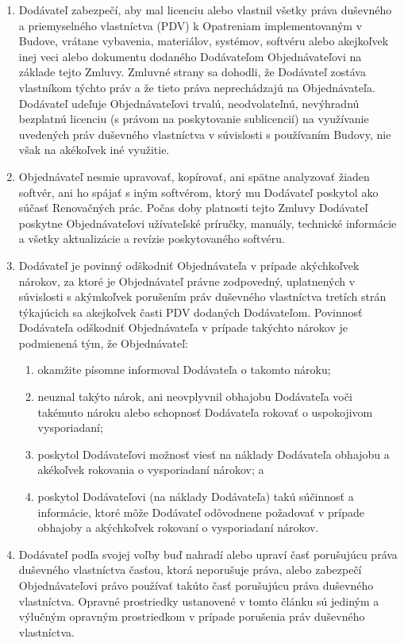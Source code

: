 \begin{multicols}{2}
\begin{enumerate}
\def\labelenumi{\arabic{enumi}.}
\item
  Dodávateľ zabezpečí, aby mal licenciu alebo vlastnil všetky práva
  duševného a priemyselného vlastníctva (PDV) k Opatreniam
  implementovaným v Budove, vrátane vybavenia, materiálov, systémov,
  softvéru alebo akejkoľvek inej veci alebo dokumentu dodaného
  Dodávateľom Objednávateľovi na základe tejto Zmluvy. Zmluvné strany sa
  dohodli, že Dodávateľ zostáva vlastníkom týchto práv a že tieto práva
  neprechádzajú na Objednávateľa. Dodávateľ udeľuje Objednávateľovi
  trvalú, neodvolateľnú, nevýhradnú bezplatnú licenciu (s právom na
  poskytovanie sublicencií) na využívanie uvedených práv duševného
  vlastníctva v súvislosti s používaním Budovy, nie však na akékoľvek
  iné využitie.
\item
  Objednávateľ nesmie upravovať, kopírovať, ani spätne analyzovať žiaden
  softvér, ani ho spájať s iným softvérom, ktorý mu Dodávateľ poskytol
  ako súčasť Renovačných prác. Počas doby platnosti tejto Zmluvy
  Dodávateľ poskytne Objednávateľovi užívateľské príručky, manuály,
  technické informácie a všetky aktualizácie a revízie poskytovaného
  softvéru.
\item
  Dodávateľ je povinný odškodniť Objednávateľa v prípade akýchkoľvek
  nárokov, za ktoré je Objednávateľ právne zodpovedný, uplatnených v
  súvislosti s akýmkoľvek porušením práv duševného vlastníctva tretích
  strán týkajúcich sa akejkoľvek časti PDV dodaných Dodávateľom.
  Povinnosť Dodávateľa odškodniť Objednávateľa v prípade takýchto
  nárokov je podmienená tým, že Objednávateľ:

  \begin{enumerate}
  \def\labelenumii{\arabic{enumii}.}
  \item
    okamžite písomne informoval Dodávateľa o takomto nároku;
  \item
    neuznal takýto nárok, ani neovplyvnil obhajobu Dodávateľa voči
    takémuto nároku alebo schopnosť Dodávateľa rokovať o uspokojivom
    vysporiadaní;
  \item
    poskytol Dodávateľovi možnosť viesť na náklady Dodávateľa obhajobu a
    akékoľvek rokovania o vysporiadaní nárokov; a
  \item
    poskytol Dodávateľovi (na náklady Dodávateľa) takú súčinnosť a
    informácie, ktoré môže Dodávateľ odôvodnene požadovať v prípade
    obhajoby a akýchkoľvek rokovaní o vysporiadaní nárokov.
  \end{enumerate}
\item
  Dodávateľ podľa svojej voľby buď nahradí alebo upraví časť porušujúcu
  práva duševného vlastníctva časťou, ktorá neporušuje práva, alebo
  zabezpečí Objednávateľovi právo používať takúto časť porušujúcu práva
  duševného vlastníctva. Opravné prostriedky ustanovené v tomto článku
  sú jediným a výlučným opravným prostriedkom v prípade porušenia práv
  duševného vlastníctva.
\end{enumerate}


\end{multicols}
